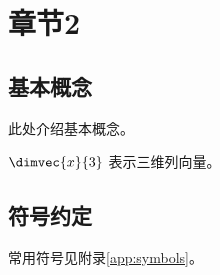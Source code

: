 \chapter{章节2}
\label{chap:chapter2}

\section{基本概念}
此处介绍基本概念。
\begin{definition}[向量]
\(\dimvec{x}{3}\) 表示三维列向量。
\end{definition}

\section{符号约定}
常用符号见附录\ref{app:symbols}。
